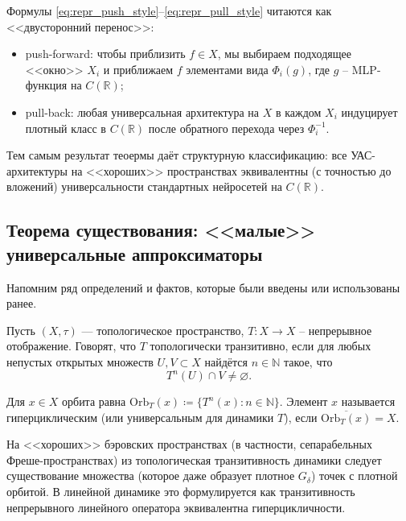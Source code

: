 \documentclass[../NDCNNAI_main.tex]{subfiles}
\begin{document}
\begin{corollary}
Формулы \eqref{eq:repr_push_style}--\eqref{eq:repr_pull_style} читаются как <<двусторонний перенос>>:
\begin{itemize}
\item push-forward: чтобы приблизить $f\in X$, мы выбираем подходящее <<окно>> $X_i$ и приближаем $f$
элементами вида $\Phi_i(g)$, где $g$ -- MLP-функция на $C(\mathbb{R})$;
\item pull-back: любая универсальная архитектура на $X$ в каждом $X_i$ индуцирует плотный класс
в $C(\mathbb{R})$ после обратного перехода через $\Phi_i^{-1}$.
\end{itemize}
Тем самым результат теоермы даёт структурную классификацию:
все УАС-архитектуры на <<хороших>> пространствах эквивалентны (с точностью до вложений)
универсальности стандартных нейросетей на $C(\mathbb{R})$.    
\end{corollary}

\subsection{Теорема существования: <<малые>> универсальные аппроксиматоры}
Напомним ряд определений и фактов, которые были введены или использованы ранее.
\begin{definition}
Пусть $(X,\tau)$ --- топологическое пространство, $T\colon X\to X$ -- непрерывное отображение.
Говорят, что $T$ топологически транзитивно, если для любых непустых открытых множеств
$U,V\subset X$ найдётся $n\in\mathbb{N}$ такое, что
\[
T^{n}(U)\cap V\neq\varnothing.
\]
\end{definition}

\begin{definition}
Для $x\in X$ орбита равна $\mathrm{Orb}_T(x)\coloneq \{T^n(x):n\in\mathbb{N}\}$.
Элемент $x$ называется гиперциклическим (или универсальным для динамики $T$),
если $\overline{\mathrm{Orb}_T(x)}=X$.
\end{definition}

\begin{theorem}
На <<хороших>> бэровских пространствах (в частности, сепарабельных Фреше-пространствах)
из топологическая транзитивность динамики следует существование множества (которое даже образует плотное $G_\delta$)
точек с плотной орбитой. В линейной динамике это формулируется как транзитивность непрерывного линейного оператора эквивалентна гиперцикличности.
\end{theorem}
\end{document}
